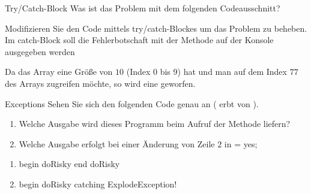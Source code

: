 \documentclass{../preamble}
\begin{document}
\clearpage

\begin{task}[credit = \stars{1}{3}]{Try/Catch-Block}
    Was ist das Problem mit dem folgenden Codeausschnitt?
    
    Modifizieren Sie den Code mittels \textcolor{keywordcolor}{try}/\textcolor{keywordcolor}{catch}-Blockes um das Problem zu beheben. Im \textcolor{keywordcolor}{catch}-Block soll die Fehlerbotschaft mit der Methode  auf der Konsole ausgegeben werden

    \begin{solution}
        Da das Array eine Größe von \(10\) (Index \(0\) bis \(9\)) hat und man auf dem Index \(77\) des Arrays zugreifen möchte, so wird eine  geworfen.
        
    \end{solution}
\end{task}

\clearpage

\begin{task}[credit = \stars{1}{3}]{Exceptions}
    Sehen Sie sich den folgenden Code genau an ( erbt von ).
    \begin{enumerate}[label = (\arabic*)]
        \item Welche Ausgabe wird dieses Programm beim Aufruf der Methode  liefern?
        \item Welche Ausgabe erfolgt bei einer Änderung von Zeile \(2\) in   = \textcolor{stringcolor}{\grqq yes\grqq};
    \end{enumerate}
    

    \begin{solution}
        \begin{enumerate}[label = (\arabic*)]
            \item begin doRisky
                  \newline
                  end doRisky
            \item begin doRisky
                  \newline
                  catching ExplodeException!
        \end{enumerate}
    \end{solution}
\end{task}

\clearpage
\end{document}
